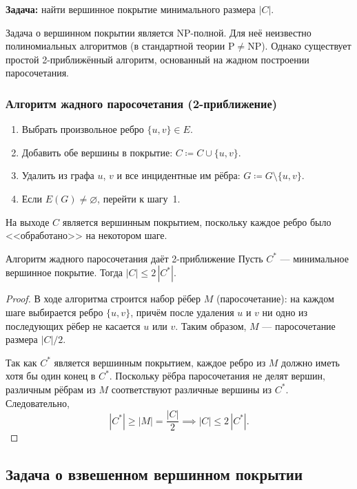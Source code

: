 \textbf{Задача:} найти вершинное покрытие минимального размера $|C|$.

Задача о вершинном покрытии является NP-полной. Для неё неизвестно полиномиальных алгоритмов (в стандартной теории $\mathrm{P} \neq \mathrm{NP}$). Однако существует простой 2-приближённый алгоритм, основанный на жадном построении паросочетания.

\subsubsection*{Алгоритм жадного паросочетания (2-приближение)}

\begin{enumerate}
	\item Выбрать произвольное ребро $\{u,v\} \in E$.
	\item Добавить обе вершины в покрытие: $C \coloneqq C \cup \{u, v\}$.
	\item Удалить из графа $u$, $v$ и все инцидентные им рёбра: $G \coloneqq G \setminus \{u,v\}$.
	\item Если $E(G) \neq \varnothing$, перейти к шагу~1.
\end{enumerate}

На выходе $C$ является вершинным покрытием, поскольку каждое ребро было <<обработано>> на некотором шаге.

\begin{Statement}{Алгоритм жадного паросочетания даёт 2-приближение}{}
	Пусть $C^*$ --- минимальное вершинное покрытие. Тогда $|C| \leq 2\,|C^*|$.
\end{Statement}

\begin{proof}
	В ходе алгоритма строится набор рёбер $M$ (паросочетание): на каждом шаге выбирается ребро $\{u,v\}$, причём после удаления $u$ и $v$ ни одно из последующих рёбер не касается $u$ или $v$. Таким образом, $M$ --- паросочетание размера $|C|/2$.
	
	Так как $C^*$ является вершинным покрытием, каждое ребро из $M$ должно иметь хотя бы один конец в $C^*$. Поскольку рёбра паросочетания не делят вершин, различным рёбрам из $M$ соответствуют различные вершины из $C^*$. Следовательно,
	\[
	|C^*| \geq |M| = \frac{|C|}{2} \implies |C| \leq 2\,|C^*|.
	\]
\end{proof}

\subsection{Задача о взвешенном вершинном покрытии}


